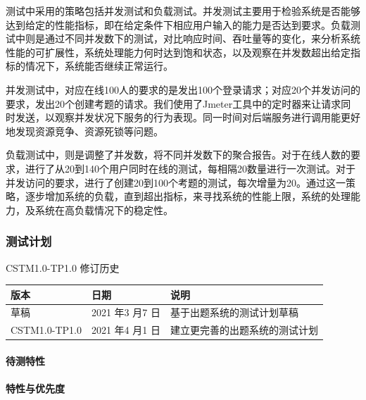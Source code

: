 \documentclass[hyperref, a4paper]{ctexart}
\let\oldparagraph\paragraph
\renewcommand{\paragraph}[1]{\oldparagraph{#1}\mbox{}}
\begin{document}
测试中采用的策略包括并发测试和负载测试。并发测试主要用于检验系统是否能够达到给定的性能指标，即在给定条件下相应用户输入的能力是否达到要求。负载测试中则是通过不同并发数下的测试，对比响应时间、吞吐量等的变化，来分析系统性能的可扩展性，系统处理能力何时达到饱和状态，以及观察在并发数超出给定指标的情况下，系统能否继续正常运行。

并发测试中，对应在线100人的要求的是发出100个登录请求；对应20个并发访问的要求，发出20个创建考题的请求。我们使用了Jmeter工具中的定时器来让请求同时发送，以观察并发状况下服务的行为表现。同一时间对后端服务进行调用能更好地发现资源竞争、资源死锁等问题。

负载测试中，则是调整了并发数，将不同并发数下的聚合报告。对于在线人数的要求，进行了从20到140个用户同时在线的测试，每相隔20数量进行一次测试。对于并发访问的要求，进行了创建20到100个考题的测试，每次增量为20。通过这一策略，逐步增加系统的负载，直到超出指标，来寻找系统的性能上限，系统的处理能力，及系统在高负载情况下的稳定性。

\hypertarget{ux6d4bux8bd5ux8ba1ux5212}{%
\subsubsection{测试计划}\label{ux6d4bux8bd5ux8ba1ux5212}}

CSTM1.0-TP1.0 修订历史

\begin{tabular}{|p{2cm}|p{3.3cm}|p{5cm}|}
\hline
版本 & 日期 & 说明\\
\hline
草稿 & 2021 年3 月7 日 & 基于出题系统的测试计划草稿\\
\hline
CSTM1.0-TP1.0 & 2021 年4 月1 日 & 建立更完善的出题系统的测试计划\\
\hline
\end{tabular}

\hypertarget{ux5f85ux6d4bux7279ux6027}{%
\paragraph{待测特性}\label{ux5f85ux6d4bux7279ux6027}}

\hypertarget{ux7279ux6027ux4e0eux4f18ux5148ux5ea6}{%
\paragraph{特性与优先度}\label{ux7279ux6027ux4e0eux4f18ux5148ux5ea6}}
\end{document}

